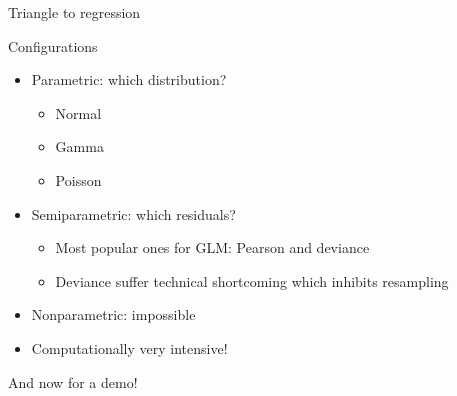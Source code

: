\documentclass[tikz]{beamer}
\begin{document}
\begin{frame}{Triangle to regression}
\end{frame}

\begin{frame}{Configurations}
    \begin{itemize}
        \item Parametric: which distribution?
              \begin{itemize}
                  \item Normal
                  \item Gamma
                  \item Poisson
              \end{itemize}
        \item Semiparametric: which residuals?
              \begin{itemize}
                  \item Most popular ones for GLM: Pearson and deviance
                  \item Deviance suffer technical shortcoming which inhibits resampling
              \end{itemize}
        \item Nonparametric: impossible
        \item Computationally very intensive!
    \end{itemize}
\end{frame}


\begin{frame}
    \centering \large And now for a demo!
\end{frame}
\end{document}

